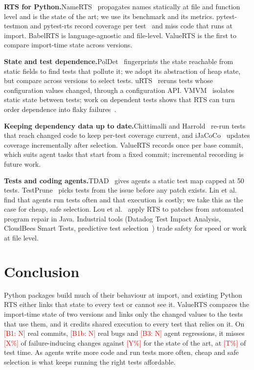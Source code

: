 \documentclass[acmsmall,screen,review,anonymous]{acmart}
\newcommand{\ph}[1]{\textcolor{red}{[#1]}}
\newcommand{\tool}{ValueRTS\xspace}
\newcommand{\para}[1]{\smallskip\noindent\textbf{#1}\hspace{0.4em}}
\begin{document}
\para{RTS for Python.}NameRTS~\cite{wang2026namerts} propagates names statically at file and function level and is the state of the art; we use its benchmark and its metrics. pytest-testmon and pytest-rts record coverage per test~\cite{kauhanen2021rts} and miss code that runs at import. BabelRTS is language-agnostic and file-level. \tool is the first to compare import-time state across versions.

\para{State and test dependence.}PolDet~\cite{gyori2015poldet} fingerprints the state reachable from static fields to find tests that pollute it; we adopt its abstraction of heap state, but compare across versions to select tests. uRTS~\cite{wang2023urts} reruns tests whose configuration values changed, through a configuration API. VMVM~\cite{bell2014vmvm} isolates static state between tests; work on dependent tests shows that RTS can turn order dependence into flaky failures~\cite{lam2020dependent}.

\para{Keeping dependency data up to date.}Chittimalli and Harrold~\cite{chittimalli2009recomputing} re-run tests that reach changed code to keep per-test coverage current, and iJaCoCo~\cite{wang2024ijacoco} updates coverage incrementally after selection. \tool records once per base commit, which suits agent tasks that start from a fixed commit; incremental recording is future work.

\para{Tests and coding agents.}TDAD~\cite{alonso2026tdad} gives agents a static test map capped at 50 tests. TestPrune~\cite{chen2026oldtests} picks tests from the issue before any patch exists. Lin et al.~\cite{lin2026runornot} find that agents run tests often and that execution is costly; we take this as the case for cheap, safe selection. Lou et al.~\cite{lou2024apr} apply RTS to patches from automated program repair in Java. Industrial tools (Datadog Test Impact Analysis, CloudBees Smart Tests, predictive test selection~\cite{machalica2019predictive}) trade safety for speed or work at file level.


\section{Conclusion}\label{sec:conclusion}
Python packages build much of their behaviour at import, and existing Python RTS either links that state to every test or cannot see it. \tool compares the import-time state of two versions and links only the changed values to the tests that use them, and it credits shared execution to every test that relies on it. On \ph{B1: N} real commits, \ph{B1b: N} real bugs and \ph{B3: N} agent regressions, it misses \ph{X\%} of failure-inducing changes against \ph{Y\%} for the state of the art, at \ph{T\%} of test time. As agents write more code and run tests more often, cheap and safe selection is what keeps running the right tests affordable.
\end{document}
